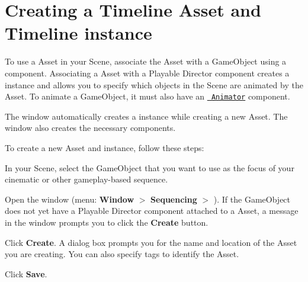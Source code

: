 \chapter{Creating a Timeline Asset and Timeline instance}
\hypertarget{md__library_2_package_cache_2com_8unity_8timeline_0d1_87_86_2_documentation_0i_2wf__instance}{}\label{md__library_2_package_cache_2com_8unity_8timeline_0d1_87_86_2_documentation_0i_2wf__instance}
\label{md__library_2_package_cache_2com_8unity_8timeline_0d1_87_86_2_documentation_0i_2wf__instance_autotoc_md1271}%
%
 To use a  Asset in your Scene, associate the  Asset with a Game\+Object using a  component. Associating a  Asset with a Playable Director component creates a  instance and allows you to specify which objects in the Scene are animated by the  Asset. To animate a Game\+Object, it must also have an \href{https://docs.unity3d.com/Manual/class-Animator.html}{\texttt{ Animator}} component.

The  window automatically creates a  instance while creating a new  Asset. The  window also creates the necessary components.

To create a new  Asset and  instance, follow these steps\+:


\begin{DoxyEnumerate}
\item In your Scene, select the Game\+Object that you want to use as the focus of your cinematic or other gameplay-\/based sequence.
\item Open the  window (menu\+: {\bfseries{Window}} \texorpdfstring{$>$}{>} {\bfseries{Sequencing}} \texorpdfstring{$>$}{>} {\bfseries{}}). If the Game\+Object does not yet have a Playable Director component attached to a  Asset, a message in the  window prompts you to click the {\bfseries{Create}} button.
\item Click {\bfseries{Create}}. A dialog box prompts you for the name and location of the  Asset you are creating. You can also specify tags to identify the  Asset.
\item Click {\bfseries{Save}}.
\end{DoxyEnumerate}



